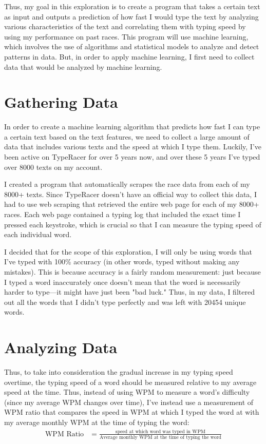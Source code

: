 \documentclass[12pt]{article}
\begin{document}
Thus, my goal in this exploration is to create a program that takes a certain text as input and outputs a prediction of how fast I would type the text by analyzing various characteristics of the text and correlating them with typing speed by using my performance on past races. This program will use machine learning, which involves the use of algorithms and statistical models to analyze and detect patterns in data. But, in order to apply machine learning, I first need to collect data that would be analyzed by machine learning.

\section*{Gathering Data}

In order to create a machine learning algorithm that predicts how fast I can type a certain text based on the text features, we need to collect a large amount of data that includes various texts and the speed at which I type them. Luckily, I've been active on TypeRacer for over 5 years now, and over these 5 years I've typed over 8000 texts on my account.

I created a program that automatically scrapes the race data from each of my 8000+ texts. Since TypeRacer doesn't have an official way to collect this data, I had to use web scraping that retrieved the entire web page for each of my 8000+ races. Each web page contained a typing log that included the exact time I pressed each keystroke, which is crucial so that I can measure the typing speed of each individual word.

I decided that for the scope of this exploration, I will only be using words that I've typed with 100\% accuracy (in other words, typed without making any mistakes). This is because accuracy is a fairly random measurement: just because I typed a word inaccurately once doesn't mean that the word is necessarily harder to type—it might have just been "bad luck." Thus, in my data, I filtered out all the words that I didn't type perfectly and was left with 20454 unique words.

\section*{Analyzing Data}

Thus, to take into consideration the gradual increase in my typing speed overtime, the typing speed of a word should be measured relative to my average speed at the time. Thus, instead of using WPM to measure a word's difficulty (since my average WPM changes over time), I've instead use a measurement of WPM ratio that compares the speed in WPM at which I typed the word at with my average monthly WPM at the time of typing the word:
\begin{align*}
	\text{WPM Ratio} & = \frac{\text{speed at which word was typed in WPM}}{\text{Average monthly WPM at the time of typing the word}}
\end{align*}
\end{document}
